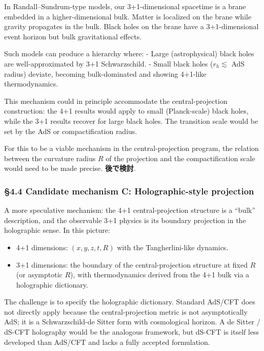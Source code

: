 \documentclass[a4paper,11pt]{article}
\theoremstyle{definition}
\providecommand{\tightlist}{\setlength{\itemsep}{0pt}\setlength{\parskip}{0pt}}
\begin{document}
In Randall--Sundrum-type models, our 3+1-dimensional spacetime is a
brane embedded in a higher-dimensional bulk. Matter is localized on the
brane while gravity propagates in the bulk. Black holes on the brane
have a 3+1-dimensional event horizon but bulk gravitational effects.

Such models can produce a hierarchy where: - Large (astrophysical) black
holes are well-approximated by 3+1 Schwarzschild. - Small black holes
(\(r_h \lesssim\) AdS radius) deviate, becoming bulk-dominated and
showing 4+1-like thermodynamics.

This mechanism could in principle accommodate the central-projection
construction: the 4+1 results would apply to small (Planck-scale) black
holes, while the 3+1 results recover for large black holes. The
transition scale would be set by the AdS or compactification radius.

For this to be a viable mechanism in the central-projection program, the
relation between the curvature radius \(R\) of the projection and the
compactification scale would need to be made precise. \textbf{後で検討}.

\subsubsection{§4.4 Candidate mechanism C: Holographic-style
projection}\label{candidate-mechanism-c-holographic-style-projection}

A more speculative mechanism: the 4+1 central-projection structure is a
``bulk'' description, and the observable 3+1 physics is its boundary
projection in the holographic sense. In this picture:

\begin{itemize}
\tightlist
\item
  4+1 dimensions: \((x, y, z, t, R)\) with the Tangherlini-like
  dynamics.
\item
  3+1 dimensions: the boundary of the central-projection structure at
  fixed \(R\) (or asymptotic \(R\)), with thermodynamics derived from
  the 4+1 bulk via a holographic dictionary.
\end{itemize}

The challenge is to specify the holographic dictionary. Standard AdS/CFT
does not directly apply because the central-projection metric is not
asymptotically AdS; it is a Schwarzschild-de Sitter form with
cosmological horizon. A de Sitter / dS-CFT holography would be the
analogous framework, but dS-CFT is itself less developed than AdS/CFT
and lacks a fully accepted formulation.
\end{document}
